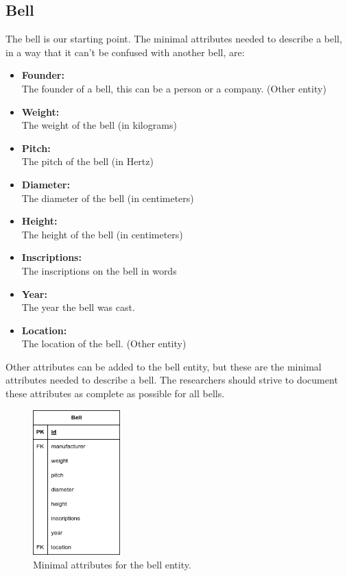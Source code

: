 \documentclass[11pt, a4paper]{article}
\begin{document}
\subsection{Bell}

The bell is our starting point. The minimal attributes needed to describe a bell, in a way that it can't be confused with another bell, are:

\begin{itemize}
    \item \textbf{Founder:} \\
        The founder of a bell, this can be a person or a company. (Other entity)
    \item \textbf{Weight:} \\
        The weight of the bell (in kilograms)
    \item \textbf{Pitch:} \\
        The pitch of the bell (in Hertz)
    \item \textbf{Diameter:} \\
        The diameter of the bell (in centimeters)
    \item \textbf{Height:} \\
        The height of the bell (in centimeters)
    \item \textbf{Inscriptions:} \\
        The inscriptions on the bell in words
    \item \textbf{Year:} \\
        The year the bell was cast.
    \item \textbf{Location:} \\
        The location of the bell. (Other entity)
\end{itemize}

Other attributes can be added to the bell entity, but these are the minimal attributes needed to describe a bell. The researchers should strive to document these attributes as complete as possible for all bells.

\clearpage

\begin{figure}[h!]
    \centering
    \includegraphics[width=0.3\textwidth]{images/bell.png}
    \caption{Minimal attributes for the bell entity.}
    \label{fig:bell-entity}
\end{figure}
\end{document}

